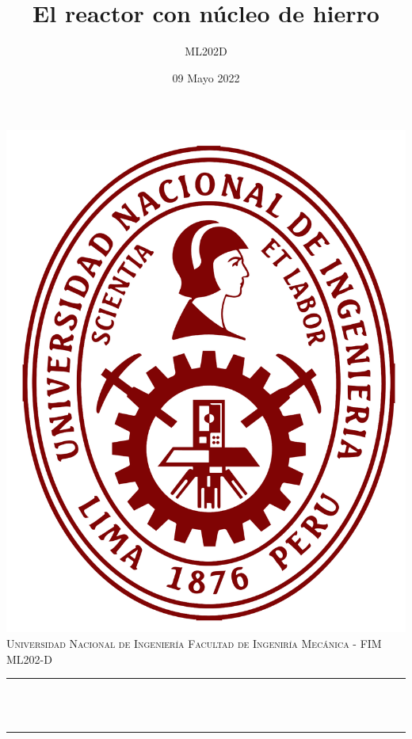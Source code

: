 \documentclass[12pt]{article}
\title{El reactor con núcleo de hierro}	    %
\author{ML202D}                             %
\date{09 Mayo 2022}		    				%
\makeatletter
\let\thetitle\@title
\makeatother
\begin{document}

\begin{titlepage}
	\centering
	\vspace*{0.0 cm}
	\includegraphics[scale = 0.09]{uni_logo.png}\\[1.0 cm]	%
	\textsc{\LARGE Universidad Nacional de Ingeniería \newline\newline Facultad de Ingeniría Mecánica - FIM}\\[1.2 cm]	%
	\textsc{\Large ML202-D}\\[0.5 cm]				%
	\rule{\linewidth}{0.2 mm} \\[0.4 cm]
	{ \huge \bfseries \thetitle}\\
	\rule{\linewidth}{0.2 mm} \\[0.5 cm]


\end{titlepage}
\end{document}
